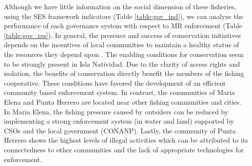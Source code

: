 \documentclass{frontiersSCNS}
\theoremstyle{definition}
\theoremstyle{definition}
\theoremstyle{definition}
\theoremstyle{remark}
\begin{document}
Although we have little information on the social dimension of these
fisheries, using the SES framework indicators (Table
\ref{table:gov_ind}), we can analyze the performance of each governance
system with respect to MR enforcement (Table \ref{table:gov_res}). In
general, the presence and success of conservation initiatives depends on
the incentives of local communities to maintain a healthy status of the
resources they depend upon \citep{jupiter_2017}. The enabling conditions
for conservation seem to be strongly present in Isla Natividad. Due to
the clarity of access rights and isolation, the benefits of conservation
directly benefit the members of the fishing cooperative. These
conditions have favored the development of an efficient community based
enforcement system. In contrast, the communities of Maria Elena and
Punta Herrero are located near other fishing communities and cities. In
Maria Elena, the fishing pressure caused by outsiders can be reduced by
implementing a strong enforcement system (in water and land) supported
by CSOs and the local government (CONANP). Lastly, the community of
Punta Herrero shows the highest levels of illegal activities which can
be attributed to its connectedness to other communities and the lack of
appropriate technologies for enforcement.
\end{document}
